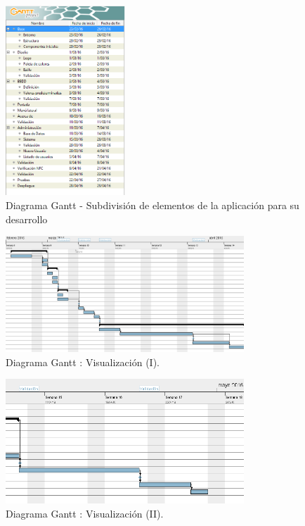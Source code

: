 \documentclass[../PFC.tex]{subfiles}
\begin{document}
\begin{figure}[H]
  \centering
  \includegraphics[width=0.4\textwidth]{./img/gantt-base}
  \caption{Diagrama Gantt - Subdivisión de elementos de la aplicación para su desarrollo}
  \label{img:gantt-base}
\end{figure}

\begin{figure}[H]
  \centering
  \includegraphics[width=0.8\textwidth]{./img/gantt1}
  \caption{Diagrama Gantt : Visualización (I).}
  \label{img:gantt1}
\end{figure}

\begin{figure}[H]
  \centering
  \includegraphics[width=0.8\textwidth]{./img/gantt2}
  \caption{Diagrama Gantt : Visualización (II).}
  \label{img:gantt2}
\end{figure}
\end{document}
